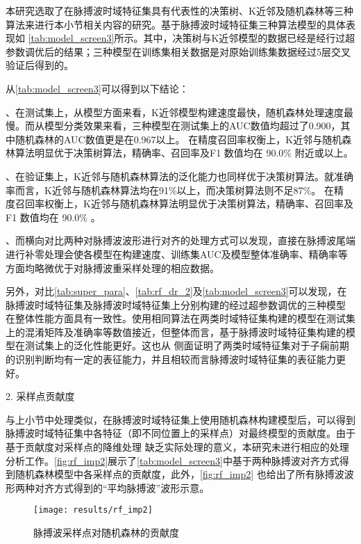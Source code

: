 本研究选取了在脉搏波时域特征集具有代表性的决策树、K近邻及随机森林等三种算法来进行本小节相关内容的研究。基于脉搏波时域特征集三种算法模型的具体表现如
\autoref{tab:model_screen3}所示。其中，决策树与K近邻模型的数据已经是经行过超参数调优后的结果；三种模型在训练集相关数据是对原始训练集数据经过5层交叉验证后得到的。

从\autoref{tab:model_screen3}可以得到以下结论：

、在测试集上，从模型方面来看，K近邻模型构建速度最快，随机森林处理速度最慢。而从模型分类效果来看，三种模型在测试集上的AUC数值均超过了0.900，其中随机森林的AUC数值更是在0.967以上。
在精度­召回率权衡上，K近邻与随机森林算法明显优于决策树算法，精确率、召回率及F1 数值均在 90.0\% 附近或以上。

、在验证集上，K近邻与随机森林算法的泛化能力也同样优于决策树算法。就准确率而言，K近邻与随机森林算法均在91\%以上，而决策树算法则不足87\%。
在精度­召回率权衡上，K近邻与随机森林算法明显优于决策树算法，精确率、召回率及F1 数值均在 90.0\% 。

、而横向对比两种对脉搏波波形进行对齐的处理方式可以发现，直接在脉搏波尾端进行补零处理会使各模型在构建速度、训练集AUC及模型整体准确率、精确率等方面均略微优于对脉搏波重采样处理的相应数据。

另外，对比\autoref{tab:super_para}、\autoref{tab:rf_dr_2}及\autoref{tab:model_screen3}可以发现，在脉搏波时域特征集及脉搏波时域特征集上分别构建的经过超参数调优的三种模型
在整体性能方面具有一致性。使用相同算法在两类时域特征集构建的模型在测试集上的混淆矩阵及准确率等数值接近，但整体而言，基于脉搏波时域特征集构建的模型在测试集上的泛化性能更好。这也从
侧面证明了两类时域特征集对于子痫前期的识别判断均有一定的表征能力，并且相较而言脉搏波时域特征集的表征能力更好。

2. 采样点贡献度

与上小节中处理类似，在脉搏波时域特征集上使用随机森林构建模型后，可以得到脉搏波时域特征集中各特征（即不同位置上的采样点）对最终模型的贡献度。由于基于贡献度对采样点的降维处理
缺乏实际处理的意义，本研究未进行相应的处理分析工作。\autoref{fig:rf_imp2}展示了\autoref{tab:model_screen3}中基于两种脉搏波对齐方式得到随机森林模型中各采样点的贡献度，此外，\autoref{fig:rf_imp2}
也给出了所有脉搏波波形两种对齐方式得到的“平均脉搏波”波形示意。

\begin{figure}[htbp]
      \centering
      \texttt{[image: results/rf\_imp2]}
      \caption{\label{fig:rf_imp2}脉搏波采样点对随机森林的贡献度}
\end{figure}


